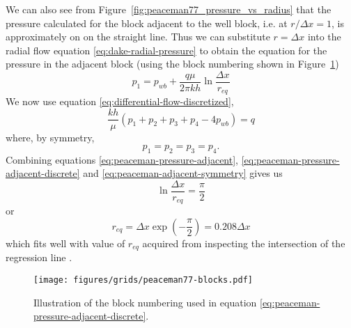 We can also see from Figure~\ref{fig:peaceman77_pressure_vs_radius} that the pressure calculated for the block adjacent to the well block, i.e. at $r/\Delta x=1$, is approximately on on the straight line. Thus we can substitute $r=\Delta x$ into the radial flow equation \eqref{eq:dake-radial-pressure} to obtain the equation for the pressure in the adjacent block (using the block numbering shown in Figure~\ref{fig:peaceman-block-numbering})
\begin{equation}
    \label{eq:peaceman-pressure-adjacent}
    p_1 = p_{wb} + \frac{q\mu}{2\pi kh} \ln{\frac{\Delta x}{r_{eq}}}
\end{equation}
We now use equation \eqref{eq:differential-flow-discretized},
\begin{equation}
    \label{eq:peaceman-pressure-adjacent-discrete}
    \frac{kh}{\mu} \left( p_1 + p_2 + p_3 + p_4 -4p_{wb}  \right) = q
\end{equation}
where, by symmetry,
\begin{equation}
    \label{eq:peaceman-adjacent-symmetry}
    p_1=p_2=p_3=p_4.
\end{equation}
Combining equations \eqref{eq:peaceman-pressure-adjacent}, \eqref{eq:peaceman-pressure-adjacent-discrete} and \eqref{eq:peaceman-adjacent-symmetry} gives us
\begin{equation}
    \ln{\frac{\Delta x}{r_{eq}}} = \frac{\pi}{2}
\end{equation}
or
\begin{equation}
    r_{eq} = \Delta x \exp{\left( -\frac{\pi}{2} \right)} = 0.208 \Delta x
\end{equation}
which fits well with value of $r_{eq}$ acquired from inspecting the intersection of the regression line \cite{Peaceman1978Interpretation}.

\begin{figure}[htb]
    \centering
    \texttt{[image: figures/grids/peaceman77-blocks.pdf]}
    \caption{Illustration of the block numbering used in equation \eqref{eq:peaceman-pressure-adjacent-discrete}.}
    \label{fig:peaceman-block-numbering}
\end{figure}







